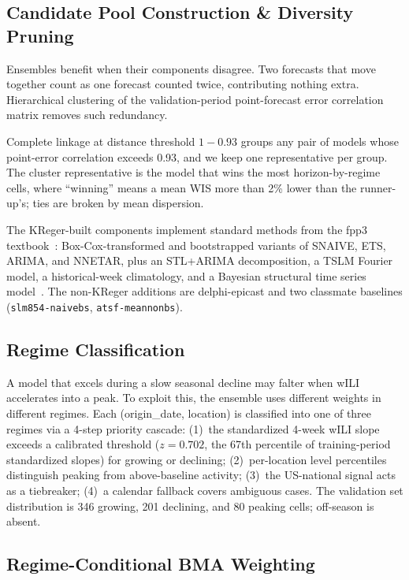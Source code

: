\documentclass[11pt]{article}
\begin{document}
\subsection{Candidate Pool Construction \& Diversity Pruning}

Ensembles benefit when their components disagree. Two forecasts that
move together count as one forecast counted twice, contributing
nothing extra. Hierarchical clustering of the validation-period
point-forecast error correlation matrix removes such redundancy.

Complete linkage at distance threshold $1 - 0.93$ groups any pair
of models whose point-error correlation exceeds 0.93, and we keep
one representative per group. The cluster representative is the
model that wins the most horizon-by-regime cells, where ``winning''
means a mean WIS more than 2\% lower than the runner-up's; ties are
broken by mean dispersion.

The KReger-built components implement standard methods from the
fpp3 textbook~\cite{hyndman2021fpp3}: Box-Cox-transformed and
bootstrapped variants of SNAIVE, ETS, ARIMA, and NNETAR, plus an
STL+ARIMA decomposition, a TSLM Fourier model, a historical-week
climatology, and a Bayesian structural time series
model~\cite{scott2014bsts}. The non-KReger additions are
delphi-epicast and two classmate baselines
(\texttt{slm854-naivebs}, \texttt{atsf-meannonbs}).

\subsection{Regime Classification}

A model that excels during a slow seasonal decline may falter when
wILI accelerates into a peak. To exploit this, the ensemble uses
different weights in different regimes. Each (origin\_date, location)
is classified into one of three regimes via a 4-step priority
cascade: (1)~the standardized 4-week wILI slope exceeds a calibrated
threshold ($z = 0.702$, the 67th percentile of training-period
standardized slopes) for growing or declining; (2)~per-location
level percentiles distinguish peaking from above-baseline activity;
(3)~the US-national signal acts as a tiebreaker; (4)~a calendar
fallback covers ambiguous cases. The validation set distribution is
346 growing, 201 declining, and 80 peaking cells; off-season is
absent.

\subsection{Regime-Conditional BMA Weighting}
\end{document}
